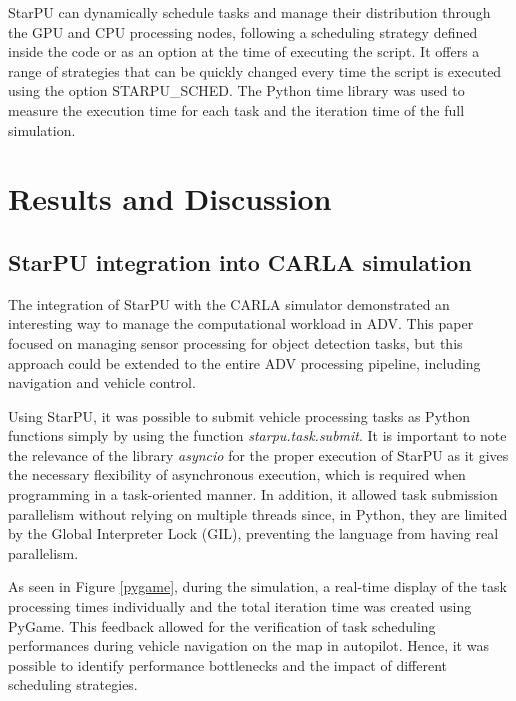 \documentclass[conference]{IEEEtran}
\begin{document}

StarPU can dynamically schedule tasks and manage their distribution through the GPU and CPU processing nodes, following a scheduling strategy defined inside the code or as an option at the time of executing the script. It offers a range of strategies that can be quickly changed every time the script is executed using the option STARPU\_SCHED. The Python time library was used to measure the execution time for each task and the iteration time of the full simulation.



\section{Results and Discussion}

\subsection{StarPU integration into CARLA simulation}
The integration of StarPU with the CARLA simulator demonstrated an interesting way to manage the computational workload in ADV. This paper focused on managing sensor processing for object detection tasks, but this approach could be extended to the entire ADV processing pipeline, including navigation and vehicle control. 

Using StarPU, it was possible to submit vehicle processing tasks as Python functions simply by using the function \textit{starpu.task.submit}. It is important to note the relevance of the library \textit{asyncio} for the proper execution of StarPU as it gives the necessary flexibility of asynchronous execution, which is required when programming in a task-oriented manner. In addition, it allowed task submission parallelism without relying on multiple threads since, in Python, they are limited by the Global Interpreter Lock (GIL), preventing the language from having real parallelism.

As seen in Figure \ref{pygame}, during the simulation, a real-time display of the task processing times individually and the total iteration time was created using PyGame. This feedback allowed for the verification of task scheduling performances during vehicle navigation on the map in autopilot. Hence, it was possible to identify performance bottlenecks and the impact of different scheduling strategies.
\end{document}
